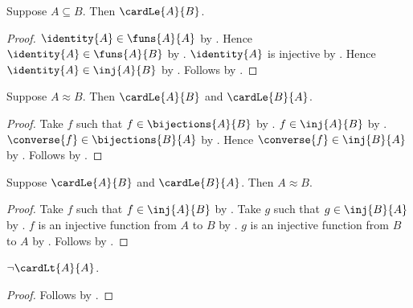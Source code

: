 \begin{proposition}\label{subseteq_cardinal_le}
    Suppose $A\subseteq B$.
    Then $\cardLe{A}{B}$.
\end{proposition}
\begin{proof}
    $\identity{A}\in\funs{A}{A}$ by .
    Hence $\identity{A}\in\funs{A}{B}$
        by .
    $\identity{A}$ is injective by .
    Hence $\identity{A}\in\inj{A}{B}$
        by .
    Follows by .
\end{proof}

\begin{proposition}\label{equinum_cardinal_le}
    Suppose $A\approx B$.
    Then $\cardLe{A}{B}$ and $\cardLe{B}{A}$.
\end{proposition}
\begin{proof}
    Take $f$ such that $f\in\bijections{A}{B}$ by .
    $f\in\inj{A}{B}$ by
        .
    $\converse{f}\in\bijections{B}{A}$
        by .
    Hence $\converse{f}\in\inj{B}{A}$
        by
        .
    Follows by .
\end{proof}

\begin{theorem}\label{cardinal_le_antisymmetric_up_to_equinum}
    Suppose $\cardLe{A}{B}$ and $\cardLe{B}{A}$.
    Then $A\approx B$.
\end{theorem}
\begin{proof}
    Take $f$ such that $f\in\inj{A}{B}$ by .
    Take $g$ such that $g\in\inj{B}{A}$ by .
    $f$ is an injective function from $A$ to $B$
        by .
    $g$ is an injective function from $B$ to $A$
        by .
    Follows by .
\end{proof}

\begin{proposition}\label{cardinal_lt_irreflexive}
    $\lnot\cardLt{A}{A}$.
\end{proposition}
\begin{proof}
    Follows by .
\end{proof}

